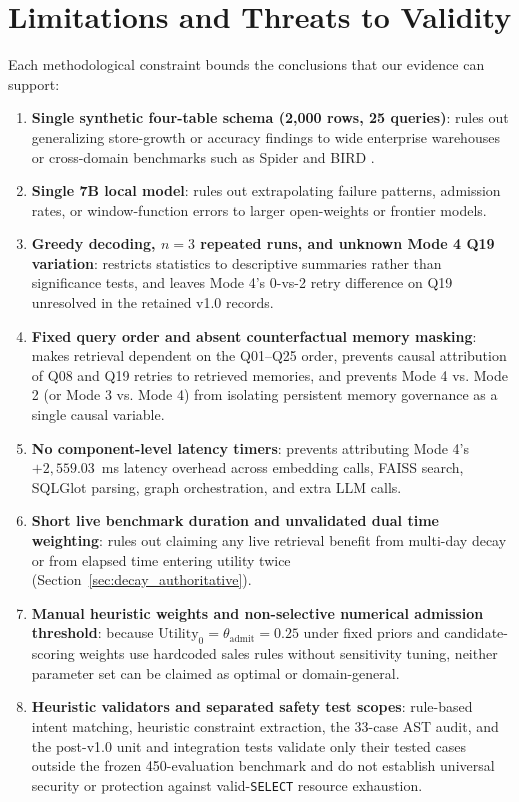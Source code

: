 \section{Limitations and Threats to Validity}
\label{sec:limitations}
Each methodological constraint bounds the conclusions that our evidence can support:
\begin{enumerate}
\item \textbf{Single synthetic four-table schema (2,000 rows, 25 queries)}: rules out generalizing store-growth or accuracy findings to wide enterprise warehouses or cross-domain benchmarks such as Spider \cite{yu2018spider} and BIRD \cite{li2023bird}.
\item \textbf{Single 7B local model}: rules out extrapolating failure patterns, admission rates, or window-function errors to larger open-weights or frontier models.
\item \textbf{Greedy decoding, $n = 3$ repeated runs, and unknown Mode 4 Q19 variation}: restricts statistics to descriptive summaries rather than significance tests, and leaves Mode 4's 0-vs-2 retry difference on Q19 unresolved in the retained v1.0 records.
\item \textbf{Fixed query order and absent counterfactual memory masking}: makes retrieval dependent on the Q01--Q25 order, prevents causal attribution of Q08 and Q19 retries to retrieved memories, and prevents Mode 4 vs. Mode 2 (or Mode 3 vs. Mode 4) from isolating persistent memory governance as a single causal variable.
\item \textbf{No component-level latency timers}: prevents attributing Mode 4's $+2,559.03$~ms latency overhead across embedding calls, FAISS search, SQLGlot parsing, graph orchestration, and extra LLM calls.
\item \textbf{Short live benchmark duration and unvalidated dual time weighting}: rules out claiming any live retrieval benefit from multi-day decay or from elapsed time entering utility twice (Section~\ref{sec:decay_authoritative}).
\item \textbf{Manual heuristic weights and non-selective numerical admission threshold}: because $\text{Utility}_0 = \theta_{\text{admit}} = 0.25$ under fixed priors and candidate-scoring weights use hardcoded sales rules without sensitivity tuning, neither parameter set can be claimed as optimal or domain-general.
\item \textbf{Heuristic validators and separated safety test scopes}: rule-based intent matching, heuristic constraint extraction, the 33-case AST audit, and the post-v1.0 unit and integration tests validate only their tested cases outside the frozen 450-evaluation benchmark and do not establish universal security or protection against valid-\texttt{SELECT} resource exhaustion.
\end{enumerate}

